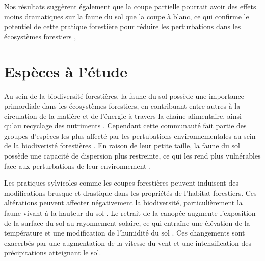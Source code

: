 Nos résultats suggèrent également que la coupe partielle pourrait avoir des effets moins dramatiques sur la faune du sol que la coupe à blanc, 
ce qui confirme le potentiel de cette pratique forestière pour réduire les perturbations dans les écosystèmes forestiers \citep{Kudrin2023metaanalysiseffects},




\section*{Espèces à l'étude}
\label{sec:species}

Au sein de la biodiversité forestières, la faune du sol possède une importance primordiale dans les écosystèmes forestiers, en contribuant entre autres à la circulation de la matière et de l'énergie à travers la chaîne alimentaire, ainsi qu'au recyclage des nutriments \citep{Seibold2021contributioninsects,Kudrin2023metaanalysiseffects}.
Cependant cette communauté fait partie des groupes d'espèces les plus affecté par les pertubations environnementales au sein de la biodiveristé forestières \citep{Marshall2000Impactsforest,Coyle2017Soilfauna}. 
En raison de leur petite taille, la faune du sol possède une capacité de dispersion plus restreinte, ce qui les rend plus vulnérables face aux perturbations de leur environnement \citep{Kudrin2023metaanalysiseffects}.


Les pratiques sylvicoles comme les coupes forestières peuvent induisent des modifications brusque et drastique dans les propriétés de l'habitat forestiers. 
Ces altérations peuvent affecter négativement la biodiversité, particulièrement la faune vivant à la hauteur du sol \citep{Lindo2003Microbialbiomass,Paillet2010Biodiversitydifferences,Fedrowitz2014Canretention,Chaudhary2016Impactforest}. 
Le retrait de la canopée augmente l'exposition de la surface du sol au rayonnement solaire, ce qui entraîne une élévation de la température et une modification de l'humidité du sol \citep{Keenan1993ecologicaleffects,Lindo2003Microbialbiomass,Heithecker2007Edgerelatedgradients,Zhang2022Intensiveforest}. 
Ces changements sont exacerbés par une augmentation de la vitesse du vent et une intensification des précipitations atteignant le sol. 


